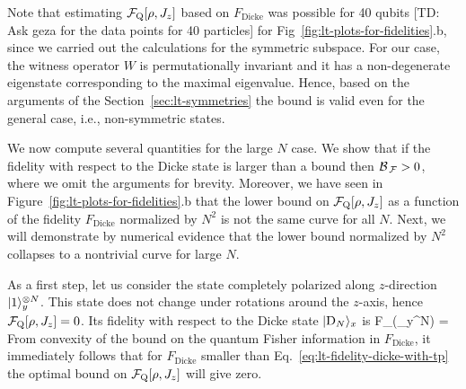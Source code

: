 Note that estimating $\mathcal{F}_{\textnormal{Q}}[{\textstyle \rho, J_z}]$ based on $F_{\text{Dicke}}$ was possible for 40 qubits [TD: Ask geza for the data points for 40 particles] for Fig~\ref{fig:lt-plots-for-fidelities}.b, since we carried out the calculations for the symmetric subspace.
For our case, the witness operator $W$ is permutationally invariant and it has a non-degenerate eigenstate corresponding to the maximal eigenvalue.
Hence, based on the arguments of the Section~\ref{sec:lt-symmetries} the bound is valid even for the general case, i.e., non-symmetric states.

We now compute several quantities for the large $N$ case.
We show that if the fidelity with respect to the Dicke state is larger than a bound then $\mathcal{B}_{\, \mathcal{F} }>0$, where we omit the arguments for brevity.
Moreover, we have seen in Figure~\ref{fig:lt-plots-for-fidelities}.b that the lower bound on $\mathcal{F}_{\textnormal{Q}}[{\textstyle \rho,J_z}]$ as a function of the fidelity $F_{\text{Dicke}}$ normalized by $N^2$ is not the same curve for all $N$.
Next, we will demonstrate by numerical evidence that the lower bound normalized by $N^2$ collapses to a nontrivial curve for large $N$.

As a first step, let us consider the state completely polarized along $z$-direction $\vert{1}\rangle_y^{\otimes N}$.
This state does not change under rotations around the $z$-axis, hence $\mathcal{F}_{\textnormal{Q}}[{\textstyle \rho,J_z}]=0$.
Its fidelity with respect to the Dicke state $\vert{\ensuremath{\textnormal{D}_{N}}}\rangle_x$ is
\be
  \label{eq:lt-fidelity-dicke-with-tp}
  F_{}(_y^{\otimes N}) = \approx {}
\ee
From convexity of the bound on the quantum Fisher information in $F_{\text{Dicke}}$, it immediately follows that for $F_{\text{Dicke}}$ smaller than Eq.~\eqref{eq:lt-fidelity-dicke-with-tp} the optimal bound on $\mathcal{F}_{\textnormal{Q}}[{\textstyle \rho,J_z}]$ will give zero.

